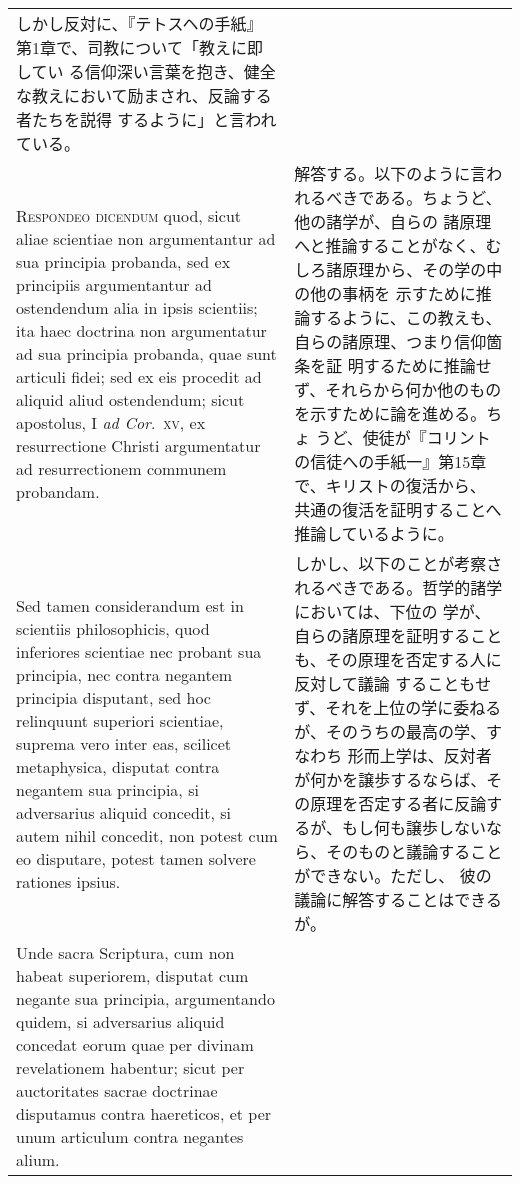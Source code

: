 \documentclass[10pt]{jsarticle}
\begin{document}
\begin{longtable}{p{21em}p{21em}}
しかし反対に、『テトスヘの手紙』第1章で、司教について「教えに即してい
る信仰深い言葉を抱き、健全な教えにおいて励まされ、反論する者たちを説得
するように」と言われている。


\\


{\scshape Respondeo dicendum} quod, sicut aliae scientiae non
argumentantur ad sua principia probanda, sed ex principiis
argumentantur ad ostendendum alia in ipsis scientiis; ita haec
doctrina non argumentatur ad sua principia probanda, quae sunt
articuli fidei; sed ex eis procedit ad aliquid aliud ostendendum;
sicut apostolus, I {\itshape ad Cor}.~{\scshape xv}, ex resurrectione
Christi argumentatur ad resurrectionem communem probandam.



&

解答する。以下のように言われるべきである。ちょうど、他の諸学が、自らの
諸原理へと推論することがなく、むしろ諸原理から、その学の中の他の事柄を
示すために推論するように、この教えも、自らの諸原理、つまり信仰箇条を証
明するために推論せず、それらから何か他のものを示すために論を進める。ちょ
うど、使徒が『コリントの信徒への手紙一』第15章で、キリストの復活から、
共通の復活を証明することへ推論しているように。


\\


Sed tamen considerandum est in scientiis philosophicis, quod
inferiores scientiae nec probant sua principia, nec contra negantem
principia disputant, sed hoc relinquunt superiori scientiae, suprema
vero inter eas, scilicet metaphysica, disputat contra negantem sua
principia, si adversarius aliquid concedit, si autem nihil concedit,
non potest cum eo disputare, potest tamen solvere rationes ipsius.



&

しかし、以下のことが考察されるべきである。哲学的諸学においては、下位の
学が、自らの諸原理を証明することも、その原理を否定する人に反対して議論
することもせず、それを上位の学に委ねるが、そのうちの最高の学、すなわち
形而上学は、反対者が何かを譲歩するならば、その原理を否定する者に反論す
るが、もし何も譲歩しないなら、そのものと議論することができない。ただし、
彼の議論に解答することはできるが。



\\


Unde sacra Scriptura, cum non habeat superiorem, disputat cum negante
sua principia, argumentando quidem, si adversarius aliquid concedat
eorum quae per divinam revelationem habentur; sicut per auctoritates
sacrae doctrinae disputamus contra haereticos, et per unum articulum
contra negantes alium.




\end{longtable}
\end{document}
